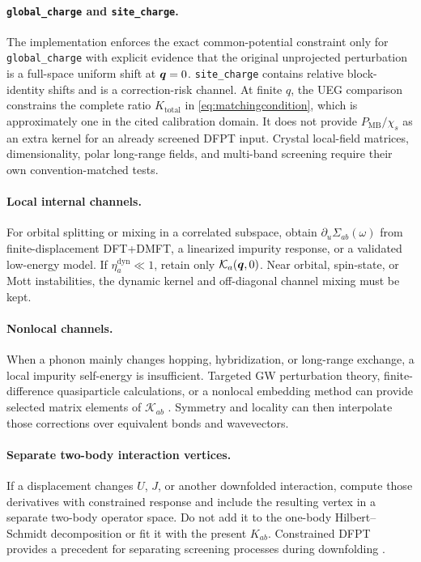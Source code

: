 \paragraph{\texttt{global\_charge} and \texttt{site\_charge}.}
The implementation enforces the exact common-potential constraint only for
\texttt{global\_charge} with explicit evidence that the original unprojected
perturbation is a full-space uniform shift at $\bm{q}=0$.
\texttt{site\_charge} contains relative block-identity shifts and
is a correction-risk channel.  At finite $q$, the UEG comparison constrains the
complete ratio $K_{\mathrm{total}}$ in \cref{eq:matchingcondition}, which is
approximately one in the cited calibration domain.  It does not provide
$P_{\mathrm{MB}}/\chi_s$ as an extra kernel for an already screened DFPT input.
Crystal local-field matrices, dimensionality, polar long-range fields, and
multi-band screening require their own convention-matched tests.

\paragraph{Local internal channels.}
For orbital splitting or mixing in a correlated subspace, obtain
$\partial_u\Sigma_{ab}(\omega)$ from finite-displacement DFT+DMFT, a linearized
impurity response, or a validated low-energy model.  If
$\eta_a^{\mathrm{dyn}}\ll1$, retain only $\mathcal K_a(\bm{q},0)$.  Near orbital,
spin-state, or Mott instabilities, the dynamic kernel and off-diagonal channel
mixing must be kept.

\paragraph{Nonlocal channels.}
When a phonon mainly changes hopping, hybridization, or long-range exchange, a
local impurity self-energy is insufficient.  Targeted GW perturbation theory,
finite-difference quasiparticle calculations, or a nonlocal embedding method can
provide selected matrix elements of $\mathcal K_{ab}$ \citep{Li2019}.  Symmetry
and locality can then interpolate those corrections over equivalent bonds and
wavevectors.

\paragraph{Separate two-body interaction vertices.}
If a displacement changes $U$, $J$, or another downfolded interaction, compute
those derivatives with constrained response and include the resulting vertex in
a separate two-body operator space.  Do not add it to the one-body
Hilbert--Schmidt decomposition or fit it with the present $K_{ab}$.  Constrained DFPT provides a precedent for
separating screening processes during downfolding \citep{Nomura2015}.

